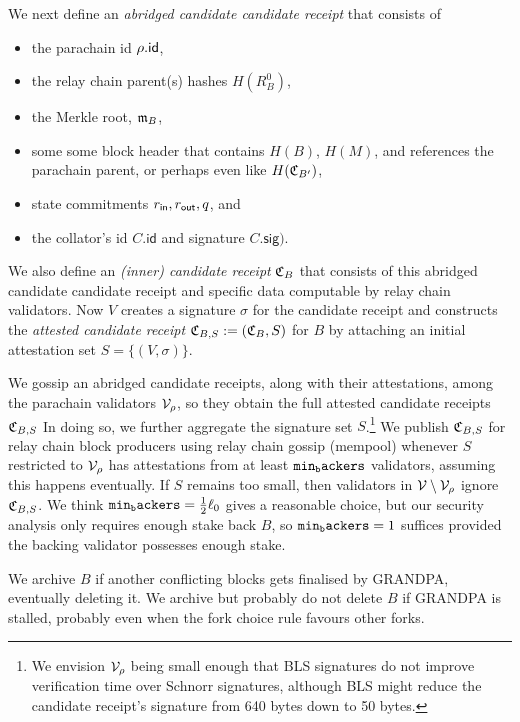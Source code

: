 We next define an {\em abridged candidate candidate receipt} that consists of 
\begin{itemize}
\item the parachain id $\rho.\mathsf{id}$,
\item the relay chain parent(s) hashes $H(R^0_B)$, 
\item the Merkle root, $\mathfrak{m}_B$,
\item some some block header that contains $H(B)$, $H(M)$, and references the parachain parent,
 or perhaps even like $H(\mathfrak{C}_{B'})$, 
\item state commitments $r_{\mathsf{in}},r_{\mathsf{out}},q$, and
\item the collator's id $C.\mathsf{id}$ and signature $C.\mathsf{sig})$. 
\end{itemize}
We also define an {\em (inner) candidate receipt} $\mathfrak{C}_B$ that consists of this abridged candidate candidate receipt and specific data computable by relay chain validators.  Now $V$ creates a signature $\sigma$ for the candidate receipt and constructs the {\em attested candidate receipt} $\mathfrak{C}_{B,S} := (\mathfrak{C}_B,S)$ for $B$ by attaching an initial attestation set $S = \{ (V,\sigma) \}$.

We gossip an abridged candidate receipts, along with their attestations, among the parachain validators $\mathcal{V}_{\rho}$, so they obtain the full attested candidate receipts $\mathfrak{C}_{B,S}$   
%
In doing so, we further aggregate the signature set $S$.\footnote{We envision $\mathcal{V}_{\rho}$ being small enough that BLS signatures do not improve verification time over Schnorr signatures, although BLS might reduce the candidate receipt's signature from 640 bytes down to 50 bytes.}  We publish $\mathfrak{C}_{B,S}$ for relay chain block producers using relay chain gossip (mempool) whenever $S$ restricted to $\mathcal{V}_\rho$ has attestations from at least $\mathtt{min_backers}$ validators, assuming this happens eventually.  If $S$ remains too small, then validators in $\mathcal{V} \setminus \mathcal{V}_\rho$ ignore $\mathfrak{C}_{B,S}$.
We think $\mathtt{min_backers} = {1\over2} \ell_0$ gives a reasonable choice, but our security analysis only requires enough stake back $B$, so $\mathtt{min_backers} = 1$ suffices provided the backing validator possesses enough stake.

We archive $B$ if another conflicting blocks gets finalised by GRANDPA, eventually deleting it.  We archive but probably do not delete $B$ if GRANDPA is stalled, probably even when the fork choice rule favours other forks.  

